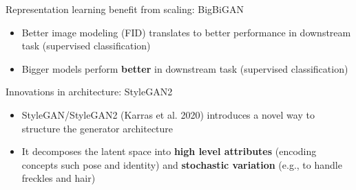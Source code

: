 \begin{frame}{Representation learning benefit from scaling: BigBiGAN}
\protect\hypertarget{representation-learning-benefit-from-scaling-bigbigan-4}{}

\begin{itemize}
\tightlist
\item
  Better image modeling (FID) translates to better performance in
  downstream task (supervised classification)
\item
  Bigger models perform \textbf{better} in downstream task (supervised
  classification)
\end{itemize}


\end{frame}

\begin{frame}{Innovations in architecture: StyleGAN2}
\protect\hypertarget{innovations-in-architecture-stylegan2}{}

\begin{itemize}
\tightlist
\item
  StyleGAN/StyleGAN2 (Karras et al. 2020) introduces a novel way to
  structure the generator architecture
\item
  It decomposes the latent space into \textbf{high level attributes}
  (encoding concepts such pose and identity) and \textbf{stochastic
  variation} (e.g., to handle freckles and hair)
\end{itemize}


\end{frame}

